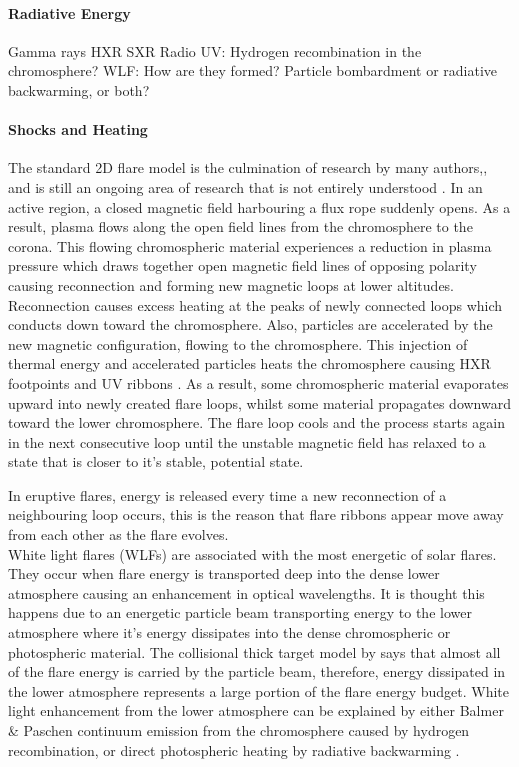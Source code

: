 \paragraph{Radiative Energy}
Gamma rays
HXR 
SXR
Radio
UV:
    Hydrogen recombination in the chromosphere?
WLF: 
    How are they formed? Particle bombardment or radiative backwarming, or both?
\paragraph{Shocks and Heating}


The standard 2D flare model is the culmination of research by many authors,\citep{1964NASSP..50..451C, 1966Natur.211..695S, 1974SoPh...34..323H, 1976SoPh...50...85K}, and is still an ongoing area of research that is not entirely understood \citep{2011LRSP....8....6S}. In an active region, a closed magnetic field harbouring a flux rope suddenly opens. As a result, plasma flows along the open field lines from the chromosphere to the corona. This flowing chromospheric material experiences a reduction in plasma pressure which draws together open magnetic field lines of opposing polarity causing reconnection and forming new magnetic loops at lower altitudes. Reconnection causes excess heating at the peaks of newly connected loops which conducts down toward the chromosphere. Also, particles are accelerated by the new magnetic configuration, flowing to the chromosphere. This injection of thermal energy and accelerated particles heats the chromosphere causing HXR footpoints \citep{1995ApJ...455..347A} and UV ribbons \citep{2009A&A...493..241F}. As a result, some chromospheric material evaporates upward into newly created flare loops, whilst some material propagates downward toward the lower chromosphere. The flare loop cools and the process starts again in the next consecutive loop until the unstable magnetic field has relaxed to a state that is closer to it's stable,  potential state.

 In eruptive flares, energy is released every time a new reconnection of a neighbouring loop occurs, this is the reason that flare ribbons appear move away from each other as the flare evolves. \\

White light flares (WLFs) are associated with the most energetic of solar flares. They occur when flare energy is transported deep into the dense lower atmosphere causing an enhancement in optical wavelengths. It is thought this happens due to an energetic particle beam transporting energy to the lower atmosphere where it's energy dissipates into the dense chromospheric or photospheric material. The collisional thick target model by \cite{1971SoPh...18..489B} says that almost all of the flare energy is carried by the particle beam, therefore, energy dissipated in the lower atmosphere represents a large portion of the flare energy budget. White light enhancement from the lower atmosphere can be explained by either Balmer \& Paschen continuum emission from the chromosphere caused by hydrogen recombination, or direct photospheric heating \citep{2007ASPC..368..417D} by radiative backwarming \citep{1989SoPh..124..303M}.


